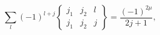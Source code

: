 \[\sum_{l}(-1)^{l+j}\begin{Bmatrix}j_{1}&j_{2}&l\\
j_{1}&j_{2}&j\end{Bmatrix}=\frac{(-1)^{2\mu}}{2j+1},\]